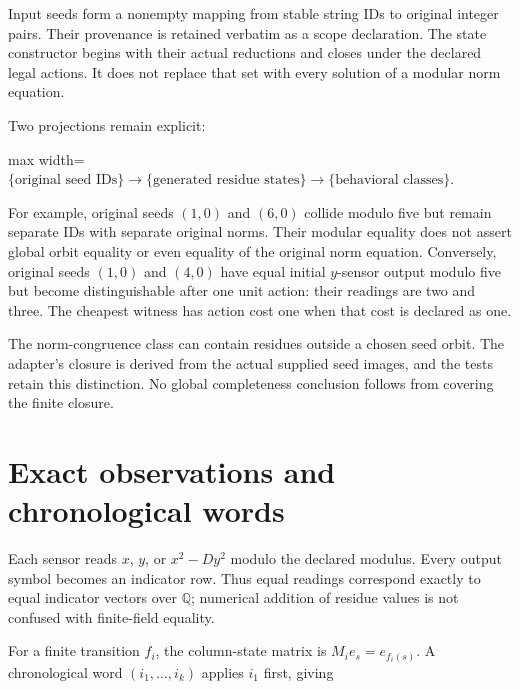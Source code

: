 \documentclass[
  11pt,
  a4paper,
]{report}
\begin{document}
Input seeds form a nonempty mapping from stable string IDs to original
integer pairs. Their provenance is retained verbatim as a scope
declaration. The state constructor begins with their actual reductions
and closes under the declared legal actions. It does not replace that
set with every solution of a modular norm equation.

Two projections remain explicit:

\begin{center}
\begin{adjustbox}{max width=\linewidth}
$\displaystyle
 \{\text{original seed IDs}\}\longrightarrow
 \{\text{generated residue states}\}\longrightarrow
 \{\text{behavioral classes}\}.
$
\end{adjustbox}
\end{center}

For example, original seeds \((1,0)\) and \((6,0)\) collide modulo five
but remain separate IDs with separate original norms. Their modular
equality does not assert global orbit equality or even equality of the
original norm equation. Conversely, original seeds \((1,0)\) and
\((4,0)\) have equal initial \(y\)-sensor output modulo five but become
distinguishable after one unit action: their readings are two and three.
The cheapest witness has action cost one when that cost is declared as
one.

The norm-congruence class can contain residues outside a chosen seed
orbit. The adapter's closure is derived from the actual supplied seed
images, and the tests retain this distinction. No global completeness
conclusion follows from covering the finite closure.

\hypertarget{exact-observations-and-chronological-words}{%
\section{Exact observations and chronological
words}\label{exact-observations-and-chronological-words}}

Each sensor reads \(x\), \(y\), or \(x^2-Dy^2\) modulo the declared
modulus. Every output symbol becomes an indicator row. Thus equal
readings correspond exactly to equal indicator vectors over
\(\mathbb Q\); numerical addition of residue values is not confused with
finite-field equality.

For a finite transition \(f_i\), the column-state matrix is
\(M_i e_s=e_{f_i(s)}\). A chronological word \((i_1,\ldots,i_k)\)
applies \(i_1\) first, giving
\end{document}
